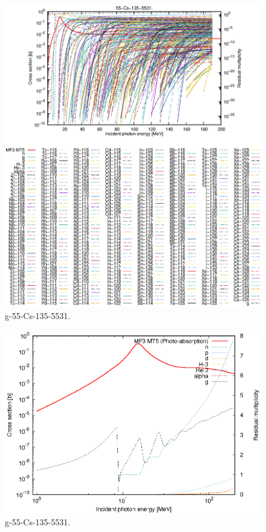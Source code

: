 \begin{figure}
 \includegraphics[width=\linewidth]{eps/g_55-Cs-135_5531.eps}
  \caption{g-55-Cs-135-5531.}
\end{figure}
\newpage \clearpage

\begin{figure}
 \includegraphics[width=\linewidth]{eps-log/g_55-Cs-135_5531.eps}
 \caption{g-55-Cs-135-5531.}
\end{figure}
\newpage \clearpage

